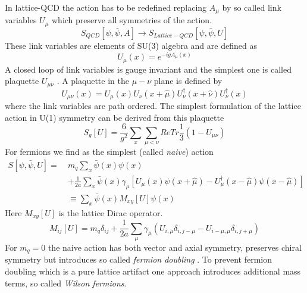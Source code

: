     \noindent
	In lattice-QCD the action has to be redefined replacing $A_\mu$ by so called link variables $U_\mu$ which preserve all symmetries of the action.
	\begin{equation}
	    S_{QCD}[\psi,\bar{\psi},A] \rightarrow S_{Lattice-QCD}[\psi,\bar{\psi},U]
	\end{equation}
	These link variables are elements of SU(3) algebra and are defined as
	\begin{equation}
	    U_\mu(x) = e^{-igA_\mu(x)}
	\end{equation}
	A closed loop of link variables is gauge invariant and the simplest one is called plaquette $U_{\mu\nu}$ \cite{Rothe2012}. A plaquette in the $\mu - \nu$ plane is defined by
	\begin{equation}
	    U_{\mu\nu}(x) = U_\mu(x)U_\nu(x+\hat{\mu})U_\nu^\dagger(x+\hat{\nu})U_\nu^\dagger(x)
	\end{equation}
	where the link variables are path ordered. The simplest formulation of the lattice action in U(1) symmetry can be derived from this plaquette \cite{introduction_to_lattice_qcd}
	\begin{equation}
	    S_g[U] = \frac{6}{g^2}\sum_x\sum_{\mu<\nu}ReTr\frac{1}{3}(1-U_{\mu\nu})
	\end{equation}
	For fermions we find as the simplest (called \textit{naive}) action
	\begin{equation}\label{naive_lattice_action}
	    \begin{aligned}
	        S[\psi,\bar{\psi},U] =\ &m_q\sum_x\bar{\psi}(x)\psi(x)\\
	        &+ \frac{1}{2a}\sum_x\bar{\psi}(x)\gamma_\mu[U_\mu(x)\psi(x+\hat{\mu})-U_\mu^\dagger(x-\hat{\mu})\psi(x-\hat{\mu})]\\
	        &\equiv \sum_x\bar{\psi}(x)M_{xy}[U]\psi(x)
	    \end{aligned}
	\end{equation}
	Here $M_{xy}[U]$ is the lattice Dirac operator.
	\begin{equation}\label{naive_lattice_operator}
	    M_{ij}[U] = m_q\delta_{ij} + \frac{1}{2a}\sum_\mu\gamma_\mu(U_{i,\mu}\delta_{i,j-\mu} - U_{i-\mu,\mu}\delta_{i,j+\mu})
	\end{equation}
	For $m_q = 0$ the naive action  has both vector and axial symmetry, preserves chiral symmetry but introduces so called \textit{fermion doubling} \cite{introduction_to_lattice_qcd}. To prevent fermion doubling which is a pure lattice artifact one approach introduces additional mass terms, so called \textit{Wilson fermions}.
	
